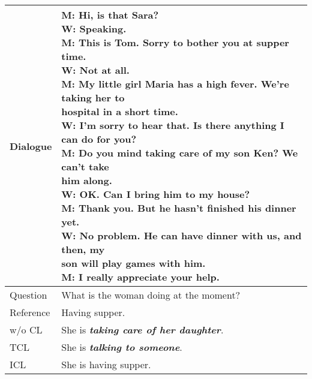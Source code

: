 \begin{table}[th!]
	\small
	\centering
	\begin{subtable}{\linewidth}
		\scriptsize
		\centering
		\begin{tabular}{p{1cm}p{5.8cm}}
			\toprule[1pt]
			{Dialogue} & \makecell[l]{M: Hi, is that Sara?\\
				W: Speaking. \\
				M: This is Tom. Sorry to bother \textbf{you} \textbf{at supper time}.\\
				W: Not at all.\\
				M: My little girl Maria has a high fever. We're taking her to \\\quad hospital in a short time.\\
				W: I'm sorry to hear that. Is there anything I can do for you? \\
				M: Do you mind taking care of my son Ken? We can't take\\\quad him along. \\
				W: OK. Can I bring him to my house?\\
				M: Thank you. But he hasn't finished his dinner yet.\\
				W: No problem. He can {have dinner with us}, and then, my \\\quad son will play games with him.\\
				M: I really appreciate your help.
			} \\
			\hline
			Question & What is the woman doing at the moment?\\
			\hline
			Reference & Having supper. \\
			\hline
			w/o CL & She is \textbf{\textit{taking care of her daughter}}.\\
			\hline
			TCL & She is \textbf{\textit{talking to someone}}. \\
			\hline
			ICL & She is having supper. \\
			
			
			

\end{tabular}
\end{subtable}
\end{table}
